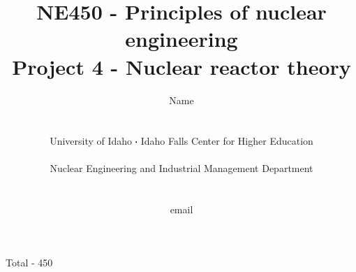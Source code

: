 \documentclass[11pt,a4paper]{article}
\newcommand*\sq{\mathbin{\vcenter{\hbox{\rule{.3ex}{.3ex}}}}} %
\begin{document}
\begin{titlepage}
    \title{
        NE450 - Principles of nuclear engineering\\
        Project 4 - Nuclear reactor theory\\
    }
    \author{
        Name
        \\ \\ \\
        University of Idaho $\sq$ Idaho Falls Center for Higher Education
        \\ \\
        Nuclear Engineering and Industrial Management Department
        \\ \\ \\
        email 
    }
\clearpage %
\maketitle
\vspace*{\fill}
\begin{flushright}{
        Total - 450 
}
\end{flushright}
\thispagestyle{empty} %
\end{titlepage}
\end{document}
